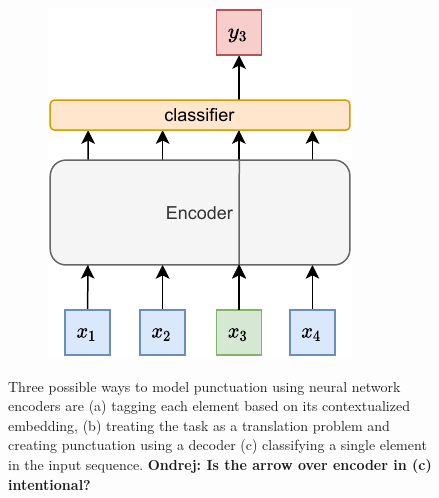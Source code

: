 \documentclass[bsc,deptreport,ai]{infthesis} %
\newcommand{\Ondrej}[1]{{\color{red} \textbf{Ondrej: #1}}}
\begin{document}
\begin{figure}[h]
\begin{subfigure}{.3\textwidth}
\includegraphics[width=.95\textwidth]{classification(2).pdf}
\caption{}
\end{subfigure}
\centering
\caption{Three possible ways to model punctuation using neural network encoders are (a) tagging each element based on its contextualized embedding, (b) treating the task as a translation problem and creating punctuation using a decoder (c) classifying a single element in the input sequence. \Ondrej{Is the arrow over encoder in (c) intentional?}}
\end{figure}
\end{document}
